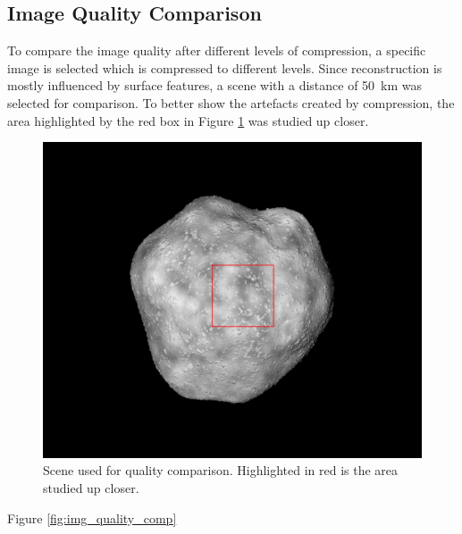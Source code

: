 \subsection{Image Quality Comparison}
To compare the image quality after different levels of compression, a specific image is selected which is compressed to different levels. Since reconstruction is mostly influenced by surface features, a scene with a distance of \SI{50}{\kilo\meter} was selected for comparison. To better show the artefacts created by compression, the area highlighted by the red box in Figure \ref{fig:img_quality_frame} was studied up closer.

\begin{figure}[htb]
    \centering
    \includegraphics[width=\textwidth]{doc/thesis/0_figures/quality_compare/jp2_1000_frame.png}
    \caption{Scene used for quality comparison. Highlighted in red is the area studied up closer.}
    \label{fig:img_quality_frame}
\end{figure}

Figure \ref{fig:img_quality_comp}

